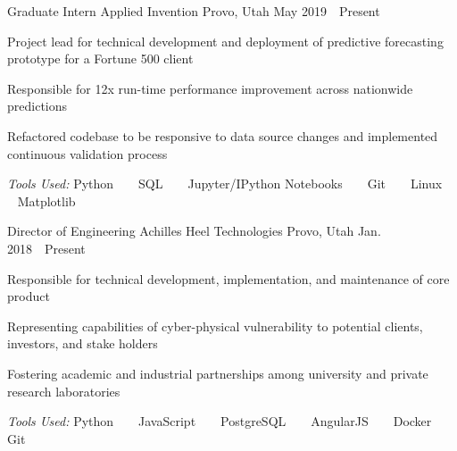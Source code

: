 

\begin{cventries}

  \cventry
    {Graduate Intern} %
    {Applied Invention} %
    {Provo, Utah} %
    {May 2019~\textendash~Present} %
    {
      \begin{cvitems} %
        \item {Project lead for technical development and deployment of predictive forecasting prototype for a Fortune 500 client}
        \item {Responsible for 12x run-time performance improvement across nationwide predictions}
        \item {Refactored codebase to be responsive to data source changes and implemented continuous validation process}
      \end{cvitems}
    }
    {
      \emph{Tools Used:} Python ~ \bullet ~ SQL ~ \bullet ~ Jupyter/IPython Notebooks ~ \bullet ~ Git  ~ \bullet ~ Linux ~ \bullet ~ Matplotlib
    }

  \cventry
    {Director of Engineering} %
    {Achilles Heel Technologies} %
    {Provo, Utah} %
    {Jan. 2018~\textendash~Present} %
    {
      \begin{cvitems} %
        \item {Responsible for technical development, implementation, and maintenance of core product}
        \item {Representing capabilities of cyber-physical vulnerability to potential clients, investors, and stake holders}
        \item {Fostering academic and industrial partnerships among university and private research laboratories}
      \end{cvitems}
    }
    {
      \emph{Tools Used:} Python ~ \bullet ~ JavaScript ~ \bullet ~ PostgreSQL ~ \bullet ~ AngularJS ~ \bullet ~ Docker ~ \bullet ~ Git
    }


\end{cventries}
